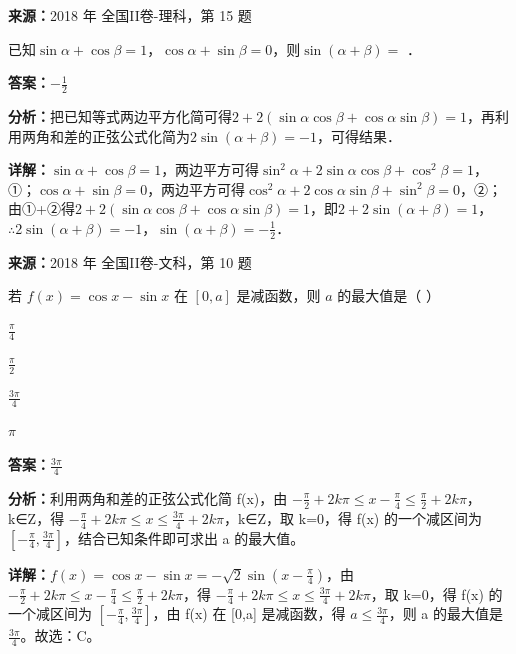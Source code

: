 \begin{question}[points=5]
\textbf{来源：}2018 年 全国II卷-理科，第 15 题\par
已知$\sin\alpha+\cos\beta=1$，$\cos\alpha+\sin\beta=0$，则$\sin(\alpha+\beta)=$        ．
\fillin[{$-\frac{1}{2}$}]
\begin{solution}
\textbf{答案：}$-\frac{1}{2}$

\textbf{分析：}把已知等式两边平方化简可得$2+2(\sin\alpha\cos\beta+\cos\alpha\sin\beta)=1$，再利用两角和差的正弦公式化简为$2\sin(\alpha+\beta)=-1$，可得结果．

\textbf{详解：}$\sin\alpha+\cos\beta=1$，两边平方可得$\sin^2\alpha+2\sin\alpha\cos\beta+\cos^2\beta=1$，①；$\cos\alpha+\sin\beta=0$，两边平方可得$\cos^2\alpha+2\cos\alpha\sin\beta+\sin^2\beta=0$，②；由①+②得$2+2(\sin\alpha\cos\beta+\cos\alpha\sin\beta)=1$，即$2+2\sin(\alpha+\beta)=1$，$\therefore 2\sin(\alpha+\beta)=-1$，$\sin(\alpha+\beta)=-\frac{1}{2}$．
\end{solution}
\end{question}

\begin{question}[points=5]
\textbf{来源：}2018 年 全国II卷-文科，第 10 题\par
若 $f(x)=\cos x-\sin x$ 在 $[0,a]$ 是减函数，则 $a$ 的最大值是（ ）
\begin{choices}
  \item $\frac{\pi}{4}$
  \item $\frac{\pi}{2}$
  \item $\frac{3\pi}{4}$
  \item $\pi$
\end{choices}
\begin{solution}
\textbf{答案：}$\frac{3\pi}{4}$

\textbf{分析：}利用两角和差的正弦公式化简 f(x)，由 $-\frac{\pi}{2}+2k\pi\leq x-\frac{\pi}{4}\leq \frac{\pi}{2}+2k\pi$，k∈Z，得 $-\frac{\pi}{4}+2k\pi\leq x\leq \frac{3\pi}{4}+2k\pi$，k∈Z，取 k=0，得 f(x) 的一个减区间为 $[-\frac{\pi}{4},\frac{3\pi}{4}]$，结合已知条件即可求出 a 的最大值。

\textbf{详解：}$f(x)=\cos x-\sin x=-\sqrt{2}\sin(x-\frac{\pi}{4})$，由 $-\frac{\pi}{2}+2k\pi\leq x-\frac{\pi}{4}\leq \frac{\pi}{2}+2k\pi$，得 $-\frac{\pi}{4}+2k\pi\leq x\leq \frac{3\pi}{4}+2k\pi$，取 k=0，得 f(x) 的一个减区间为 $[-\frac{\pi}{4},\frac{3\pi}{4}]$，由 f(x) 在 [0,a] 是减函数，得 $a\leq \frac{3\pi}{4}$，则 a 的最大值是 $\frac{3\pi}{4}$。故选：C。
\end{solution}
\end{question}


